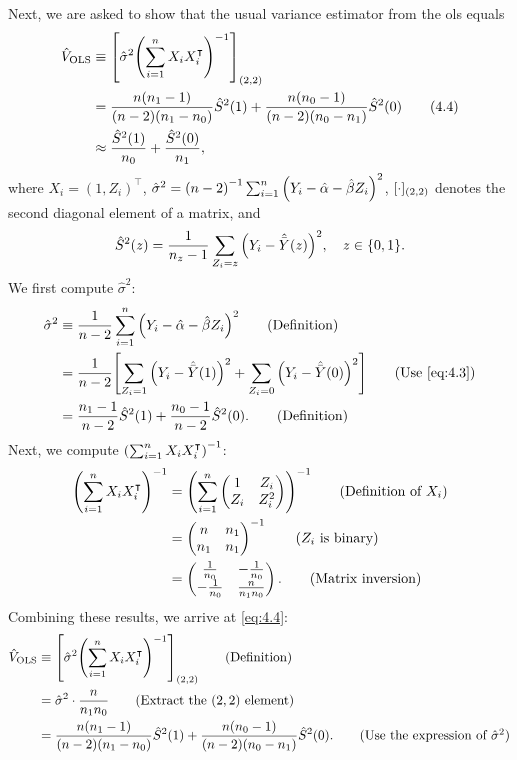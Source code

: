 \documentclass[10pt]{article}
\begin{document}
Next, we are asked to show that
the usual variance estimator from the \gls{ols} equals 
\begin{align*}
  \hat{V}_{\text{OLS}} 
  &\equiv {\left[ \hat{\sigma}^2 {\left( \sum_{i=1}^n X_i X_i^\intercal \right)}^{-1} \right]}_{{\left( 2, 2 \right)}} \\
  &= \frac{n{\left( n_1 - 1 \right)}}{(n - 2)(n_1 - n_0)} \hat{S}^2(1)
  + \frac{n{\left( n_0 - 1 \right)}}{(n - 2)(n_0 - n_1)} \hat{S}^2(0) \tag{4.4} \label{eq:4.4} \\
  &\approx \frac{\hat{S}^2(1)}{n_0} + \frac{\hat{S}^2(0)}{n_1},
\end{align*}
where $X_i = (1, Z_i)^\intercal$,
$\hat{\sigma}^2 = {\left( n - 2 \right)}^{-1} \sum_{i=1}^n {\left( Y_i - \hat{\alpha} - \hat{\beta} Z_i \right)}^2$,
$[\cdot]_{{\left( 2, 2 \right)}}$ denotes the second diagonal element of a matrix,
and
\begin{align*}
  \hat{S}^2(z) = \frac{1}{n_z - 1} \sum_{Z_i = z} {\left( Y_i - \hat{\bar{Y}}(z) \right)}^2, \quad z \in {\left\lbrace 0, 1 \right\rbrace}.
\end{align*}
We first compute $\hat{\sigma}^2$:
\begin{align*}
  \hat{\sigma}^2 
  &\equiv \frac{1}{n - 2} \sum_{i=1}^n \bp{Y_i - \hat{\alpha} - \hat{\beta} Z_i}^2 \tag{Definition} \\
  &= \frac{1}{n - 2} \bs{\sum_{Z_i = 1} \bp{Y_i - \hat{\bar{Y}}(1)}^2 + \sum_{Z_i = 0} \bp{Y_i - \hat{\bar{Y}}(0)}^2} \tag{Use \cref{eq:4.3}} \\
  &= \frac{n_1 - 1}{n - 2} \hat{S}^2(1) + \frac{n_0 - 1}{n - 2} \hat{S}^2(0). \tag{Definition}
\end{align*}
Next, we compute ${\left( \sum_{i=1}^n X_i X_i^\intercal \right)}^{-1}$:
\begin{align*}
  {\left( \sum_{i=1}^n X_i X_i^\intercal \right)}^{-1}
  &= {\left( 
    \sum_{i=1}^n 
    \begin{pmatrix}
    1 & Z_i \\
    Z_i & Z_i^2
    \end{pmatrix}
     \right)}^{-1} \tag{Definition of $X_i$} \\
  &= \begin{pmatrix}
    n & n_1 \\
    n_1 & n_1
    \end{pmatrix}^{-1} \tag{$Z_i$ is binary} \\
  &= \begin{pmatrix}
    \frac{1}{n_0} & -\frac{1}{n_0} \\
    -\frac{1}{n_0} & \frac{n}{n_1 n_0}
  \end{pmatrix}. \tag{Matrix inversion}
\end{align*}
Combining these results, we arrive at \cref{eq:4.4}:
\begin{align*}
  \hat{V}_{\text{OLS}} 
  &\equiv \bs{\hat{\sigma}^2 \bp{\sum_{i=1}^n X_i X_i^\intercal}^{-1}}_{\bp{2, 2}} \tag{Definition} \\
  &= \hat{\sigma}^2 \cdot \frac{n}{n_1 n_0} \tag{Extract the $(2, 2)$ element} \\
  &= \frac{n\bp{n_1 - 1}}{(n - 2)(n_1 - n_0)} \hat{S}^2(1)
  + \frac{n\bp{n_0 - 1}}{(n - 2)(n_0 - n_1)} \hat{S}^2(0). \tag{Use the expression of $\hat{\sigma}^2$}
\end{align*}
\end{document}
